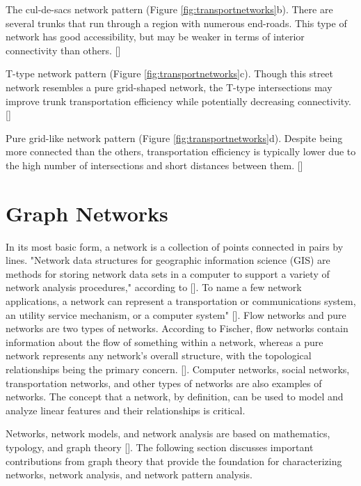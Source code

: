 The cul-de-sacs network pattern (Figure \ref{fig:transportnetworks}b). There are several trunks that run through a region with numerous end-roads. This type of network has good accessibility, but may be weaker in terms of interior connectivity than others. [\cite{Chan:2011,Lima:2015,Han:2020}]

T-type network pattern (Figure \ref{fig:transportnetworks}c). Though this street network resembles a pure grid-shaped network, the T-type intersections may improve trunk transportation efficiency while potentially decreasing connectivity. [\cite{Chan:2011,Lima:2015,Han:2020}]

Pure grid-like network pattern (Figure \ref{fig:transportnetworks}d). Despite being more connected than the others, transportation efficiency is typically lower due to the high number of intersections and short distances between them. [\cite{Chan:2011,Lima:2015,Han:2020}]

\section{Graph Networks}
In its most basic form, a network is a collection of points connected in pairs by lines. \cite{Newman:2010} "Network data structures for geographic information science (GIS) are methods for storing network data sets in a computer to support a variety of network analysis procedures," according to [\cite{Curtin:2008}]. To name a few network applications, a network can represent a transportation or communications system, an utility service mechanism, or a computer system" [\cite{Curtin:2008}]. Flow networks and pure networks are two types of networks. According to Fischer, flow networks contain information about the flow of something within a network, whereas a pure network represents any network's overall structure, with the topological relationships being the primary concern. [\cite{Ficsher:2003}]. Computer networks, social networks, transportation networks, and other types of networks are also examples of networks. The concept that a network, by definition, can be used to model and analyze linear features and their relationships is critical.

Networks, network models, and network analysis are based on mathematics, typology, and graph theory [\cite{Sovik:2014}]. The following section discusses important contributions from graph theory that provide the foundation for characterizing networks, network analysis, and network pattern analysis.

